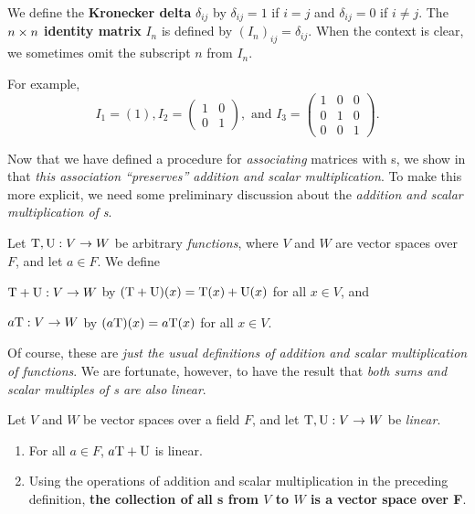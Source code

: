 \begin{definition} \label{def 2.7}
We define the \textbf{Kronecker delta} \(\delta_{ij}\) by \(\delta_{ij} = 1\) if \(i = j\) and \(\delta_{ij} = 0\) if \(i \ne j\).
The \(n \times n\) \textbf{identity matrix} \(I_n\) is defined by \((I_n)_{ij} = \delta_{ij}\).
When the context is clear, we sometimes omit the subscript \(n\) from \(I_n\).

For example,
\[
    I_1 = (1), I_2 = \begin{pmatrix} 1 & 0 \\ 0 & 1 \end{pmatrix}, 
    \text{ and } I_3 = \begin{pmatrix} 1 & 0 & 0 \\ 0 & 1 & 0 \\ 0 & 0 & 1 \end{pmatrix}.
\]
\end{definition}

Now that we have defined a procedure for \emph{associating} matrices with \LTRAN{}s, we show in  that \emph{this association ``preserves'' addition and scalar multiplication}.
To make this more explicit, we need some preliminary discussion about the \emph{addition and scalar multiplication of \LTRAN{}s}.

\begin{definition} \label{def 2.8}
Let \(\mathrm{T}, \mathrm{U}: V \to W\) be arbitrary \emph{functions}, where \(V\) and \(W\) are vector spaces over \(F\), and let \(a \in F\).
We define

 \(\mathrm{T} + \mathrm{U} : V \to W\) by \((\mathrm{T} + \mathrm{U})(x) = \mathrm{T}(x) + \mathrm{U}(x)\) for all \(x \in V\), and

 \(a\mathrm{T}: V \to W\) by \((a\mathrm{T})(x) = a\mathrm{T}(x)\) for all \(x \in V\).
\end{definition}

\begin{note}
Of course, these are \emph{just the usual definitions of addition and scalar multiplication of functions}.
We are fortunate, however, to have the result that \emph{both sums and scalar multiples of \LTRAN{}s are also linear}.
\end{note}

\begin{theorem} \label{thm 2.7}
Let \(V\) and \(W\) be vector spaces over a field \(F\), and let \(\mathrm{T}, \mathrm{U}: V \to W\) be \emph{linear}.
\begin{enumerate}
\item For all \(a \in F\), \(a\mathrm{T} + \mathrm{U}\) is linear.
\item Using the operations of addition and scalar multiplication in the preceding definition, \textbf{the collection of all \LTRAN{}s from \(V\) to \(W\) is a vector space over F}.
\end{enumerate}
\end{theorem}


